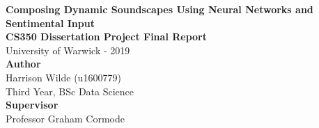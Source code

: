\documentclass[12pt,]{article}
\title{}
\author{}
\date{}
\begin{document}

\null\vspace{\fill}
\begin{center}
\Huge{\textbf{Composing Dynamic Soundscapes Using Neural Networks and Sentimental Input}}\\
\vspace*{2\baselineskip}
\Large{\textbf{CS350 Dissertation Project Final Report}}\\
University of Warwick - 2019\\
\vspace*{2\baselineskip}
\Large{\textbf{Author}}\\
Harrison Wilde (u1600779)\\
Third Year, BSc Data Science\\
\vspace*{2\baselineskip}
\Large{\textbf{Supervisor}}\\
Professor Graham Cormode\\
\vspace*{3\baselineskip}
\end{center}
\vspace{\fill}

\onehalfspacing

\hypersetup{linkcolor = black}
\newpage
{}
\tableofcontents
\newpage
\setcounter{page}{3}
\listoffigures 
\newpage

\listoftables
\newpage
\hypersetup{linkcolor = red}


\end{document}
